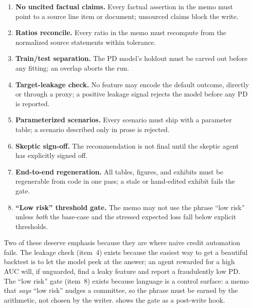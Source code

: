 \begin{enumerate}
\item \textbf{No uncited factual claims.} Every factual assertion in the memo must
point to a source line item or document; unsourced claims block the write.
\item \textbf{Ratios reconcile.} Every ratio in the memo must recompute from the
normalized source statements within tolerance.
\item \textbf{Train/test separation.} The PD model's holdout must be carved out
before any fitting; an overlap aborts the run.
\item \textbf{Target-leakage check.} No feature may encode the default outcome,
directly or through a proxy; a positive leakage signal rejects the model before any
PD is reported.
\item \textbf{Parameterized scenarios.} Every scenario must ship with a parameter
table; a scenario described only in prose is rejected.
\item \textbf{Skeptic sign-off.} The recommendation is not final until the skeptic
agent has explicitly signed off.
\item \textbf{End-to-end regeneration.} All tables, figures, and exhibits must be
regenerable from code in one pass; a stale or hand-edited exhibit fails the gate.
\item \textbf{``Low risk'' threshold gate.} The memo may not use the phrase ``low
risk'' unless \emph{both} the base-case and the stressed expected loss fall below
explicit thresholds.
\end{enumerate}

Two of these deserve emphasis because they are where naive credit automation fails.
The leakage check (item~4) exists because the easiest way to get a beautiful
backtest is to let the model peek at the answer; an agent rewarded for a high AUC
will, if unguarded, find a leaky feature and report a fraudulently low PD. The
``low risk'' gate (item~8) exists because language is a control surface: a memo that
\emph{says} ``low risk'' nudges a committee, so the phrase must be earned by the
arithmetic, not chosen by the writer.  shows the gate as a
post-write hook.

